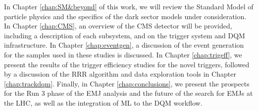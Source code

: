 In Chapter \ref{chap:SM&beyond} of this work, we will review the Standard Model of particle physics and the specifics of the dark sector models under consideration. In Chapter \ref{chap:CMS}, an overview of the CMS detector will be provided, including a description of each subsystem, and on the trigger system and DQM infrastructure. In Chapter \ref{chap:eventgen}, a discussion of the event generation for the samples used in these studies is discussed. In Chapter \ref{chap:trigeff}, we present the results of the trigger efficiency studies for the novel triggers, followed by a discussion of the RRR algorithm and data exploration tools in Chapter \ref{chap:trackdqm}. Finally, in Chapter \ref{chap:conclusions}, we present the prospects for the Run 3 phase of the EMJ analysis and the future of the search for EMJs at the LHC, as well as the integration of ML to the DQM workflow.